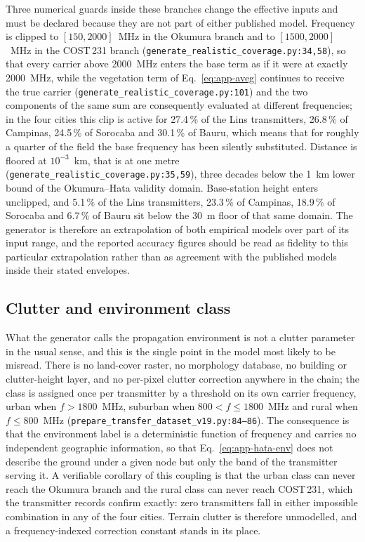 Three numerical guards inside these branches change the effective inputs
and must be declared because they are not part of either published model.
Frequency is clipped to $[150, 2000]$~MHz in the Okumura branch and to
$[1500, 2000]$~MHz in the COST\,231 branch
(\texttt{generate\_\allowbreak{}realistic\_\allowbreak{}coverage\allowbreak{}.py:\allowbreak{}34,58}), so that every carrier
above 2000~MHz enters the base term as if it were at exactly 2000~MHz,
while the vegetation term of Eq.~\eqref{eq:app-aveg} continues to receive
the true carrier (\texttt{generate\_\allowbreak{}realistic\_\allowbreak{}coverage\allowbreak{}.py:\allowbreak{}101}) and the two
components of the same sum are consequently evaluated at different
frequencies; in the four cities this clip is active for 27.4\,\% of the
Lins transmitters, 26.8\,\% of Campinas, 24.5\,\% of Sorocaba and 30.1\,\%
of Bauru, which means that for roughly a quarter of the field the base
frequency has been silently substituted. Distance is floored at $10^{-3}$~km,
that is at one metre (\texttt{generate\_\allowbreak{}realistic\_\allowbreak{}coverage\allowbreak{}.py:\allowbreak{}35,59}),
three decades below the 1~km lower bound of the Okumura--Hata validity
domain. Base-station height enters unclipped, and 5.1\,\% of the Lins
transmitters, 23.3\,\% of Campinas, 18.9\,\% of Sorocaba and 6.7\,\% of
Bauru sit below the 30~m floor of that same domain. The generator is
therefore an extrapolation of both empirical models over part of its input
range, and the reported accuracy figures should be read as fidelity to this
particular extrapolation rather than as agreement with the published
models inside their stated envelopes.

\subsection{Clutter and environment class}

What the generator calls the propagation environment is not a clutter
parameter in the usual sense, and this is the single point in the model
most likely to be misread. There is no land-cover raster, no morphology
database, no building or clutter-height layer, and no per-pixel clutter
correction anywhere in the chain; the class is assigned once per
transmitter by a threshold on its own carrier frequency, urban when
$f>1800$~MHz, suburban when $800<f\le 1800$~MHz and rural when
$f\le 800$~MHz (\texttt{prepare\_\allowbreak{}transfer\_\allowbreak{}dataset\_\allowbreak{}v19.py:\allowbreak{}84--86}). The
consequence is that the environment label is a deterministic function of
frequency and carries no independent geographic information, so that
Eq.~\eqref{eq:app-hata-env} does not describe the ground under a given node
but only the band of the transmitter serving it. A verifiable corollary of
this coupling is that the urban class can never reach the Okumura branch
and the rural class can never reach COST\,231, which the transmitter records
confirm exactly: zero transmitters fall in either impossible combination in any of
the four cities. Terrain clutter is therefore unmodelled, and a frequency-indexed
correction constant stands in its place.

